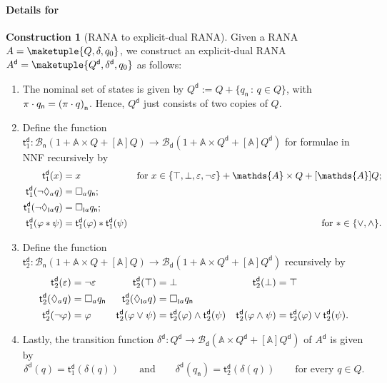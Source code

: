 \documentclass[10pt,a4paper]{amsart}
\theoremstyle{definition}
\newtheorem{construction}[theo]{Construction}
\newcommand{\At}{\mathds{A}}
\newcommand{\trans}{\mathsf{t}}
\newcommand{\allbool}{\mathcal{B}}
\newcommand{\negsym}{\mathsf{n}}
\newcommand{\negstate}[1]{#1_{\negsym}}
\newcommand{\negbool}{\allbool_{\negsym}}
\newcommand{\dualbool}{\allbool_\mathsf{d}}
\newcommand{\dual}[1]{{#1}^\mathsf{d}}
\newcommand{\names}{\At}
\newcommand{\Abstr}[2][\names]{[#1]#2}
\newcommand{\set}[1]{\{#1\}}
\newcommand{\setw}[2]{\{#1\,:\,#2\}}
\newcommand{\scriptmidmid}{\hspace{0.2ex}{\rule[-0.1ex]{0.6pt}{1.1ex}}\hspace{0.2ex}}
\newcommand{\scriptnew}[1]{{\scriptmidmid}#1}
\let\originalleft\left
\let\originalright\right
\renewcommand{\left}{\mathopen{}\mathclose\bgroup\originalleft}
\renewcommand{\right}{\aftergroup\egroup\originalright}
\begin{document}
\paragraph*{Details for~}

\begin{construction}[RANA to explicit-dual RANA]\label{constr:neg2dual}
    Given a RANA $A = \maketuple{Q, \delta, q_0}$, we construct an explicit-dual RANA
$\dual{A} = \maketuple{\dual{Q},\dual{\delta},q_0}$ as follows:
    \begin{enumerate}
    \item The nominal set of states is given by $\dual{Q} := Q + \setw{\negstate{q}}{q \in Q}$, with
     $\pi \cdot \negstate{q} =
            \negstate{\left(\pi \cdot q\right)}$. Hence, $\dual{Q}$ just consists of two copies of $Q$.
        \item Define the function $\dual{\trans}_1\colon \negbool(1 + \names \times Q + \Abstr{Q}) \to \dualbool(1 +
            \names \times \dual{Q} + \Abstr{\dual{Q}})$ for formulae in NNF recursively by
\begin{align*}
\dual{\trans}_1(x) &= x & \text{for $x \in \set{\top,\bot,\varepsilon,\neg\varepsilon} + \names \times Q + \Abstr{Q}$};\\
\dual{\trans}_1(\neg\Diamond_a q) &= \Box_a \negstate{q}; & \\
\dual{\trans}_1(\neg\Diamond_{\scriptnew{a}} q) &= \Box_{\scriptnew{a}} \negstate{q};& \\ 
\dual{\trans}_1(\varphi \ast \psi) &= \dual{\trans}_1(\varphi) \ast \dual{\trans}_1(\psi) & \text{for $\ast \in \set{\vee, \wedge}$}.
\end{align*}
        \item Define the function $\dual{\trans}_2\colon \negbool(1 + \names \times Q + \Abstr{Q}) \to \dualbool(1 +
            \names \times \dual{Q} + \Abstr{\dual{Q}})$ recursively by
\begin{align*}
\dual{\trans}_2(\varepsilon) &= \neg \varepsilon &
\dual{\trans}_2(\top) &= \bot &
\dual{\trans}_2(\bot) &= \top \\
\dual{\trans}_2(\Diamond_a q) &= \Box_a \negstate{q} &
\dual{\trans}_2(\Diamond_{\scriptnew{a}} q) &= \Box_{\scriptnew{a}} \negstate{q} & & \\
\dual{\trans}_2(\neg \varphi) &= \varphi &
\dual{\trans}_2(\varphi \vee \psi) &=
              \dual{\trans}_2(\varphi) \wedge \dual{\trans}_2(\psi) &
\dual{\trans}_2(\varphi \wedge \psi) &= \dual{\trans}_2(\varphi) \vee \dual{\trans}_2(\psi). 
\end{align*}
        \item Lastly, the transition function $\dual{\delta}\colon \dual{Q} \to \dualbool(\names \times \dual{Q} + \Abstr{\dual{Q}})$ of $\dual{A}$ is given by
          \[
            \dual{\delta}(q) = \dual{\trans}_1(\delta(q))
            \qquad\text{and}\qquad
            \dual{\delta}(\negstate{q}) = \dual{\trans}_2(\delta(q))
            \qquad
            \text{for every $q \in Q$.}
          \]
    \end{enumerate}
\end{construction}
\end{document}
